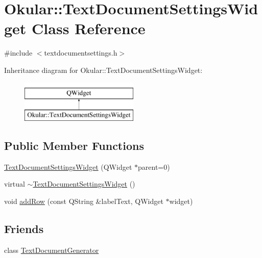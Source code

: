 \hypertarget{classOkular_1_1TextDocumentSettingsWidget}{\section{Okular\+:\+:Text\+Document\+Settings\+Widget Class Reference}
\label{classOkular_1_1TextDocumentSettingsWidget}
}


{\ttfamily \#include $<$textdocumentsettings.\+h$>$}

Inheritance diagram for Okular\+:\+:Text\+Document\+Settings\+Widget\+:\begin{figure}[H]
\begin{center}
\leavevmode
\includegraphics[height=2.000000cm]{classOkular_1_1TextDocumentSettingsWidget}
\end{center}
\end{figure}
\subsection*{Public Member Functions}
\begin{DoxyCompactItemize}
\item 
\hyperlink{classOkular_1_1TextDocumentSettingsWidget_ab2c5b8756c772e373ee893a4ecea6bc6}{Text\+Document\+Settings\+Widget} (Q\+Widget $\ast$parent=0)
\item 
virtual \hyperlink{classOkular_1_1TextDocumentSettingsWidget_a0e649443eec623a0638b3c96e2a9e144}{$\sim$\+Text\+Document\+Settings\+Widget} ()
\item 
void \hyperlink{classOkular_1_1TextDocumentSettingsWidget_a9c09dfb6f2d9e4b89c6223abe62f3908}{add\+Row} (const Q\+String \&label\+Text, Q\+Widget $\ast$widget)
\end{DoxyCompactItemize}
\subsection*{Friends}
\begin{DoxyCompactItemize}
\item 
class \hyperlink{classOkular_1_1TextDocumentSettingsWidget_a0a259fd10df5d599787dfbe154563772}{Text\+Document\+Generator}
\end{DoxyCompactItemize}


